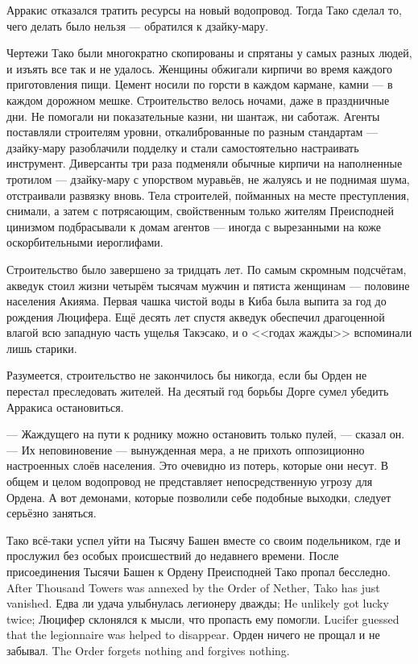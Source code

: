 Арракис отказался тратить ресурсы на новый водопровод.
Тогда Тако сделал то, чего делать было нельзя --- обратился к дзайку-мару.

Чертежи Тако были многократно скопированы и спрятаны у самых разных людей, и изъять все так и не удалось.
Женщины обжигали кирпичи во время каждого приготовления пищи.
Цемент носили по горсти в каждом кармане, камни --- в каждом дорожном мешке.
Строительство велось ночами, даже в праздничные дни.
Не помогали ни показательные казни, ни шантаж, ни саботаж.
Агенты поставляли строителям уровни, откалиброванные по разным стандартам --- дзайку-мару разоблачили подделку и стали самостоятельно настраивать инструмент.
Диверсанты три раза подменяли обычные кирпичи на наполненные тротилом --- дзайку-мару с упорством муравьёв, не жалуясь и не поднимая шума, отстраивали развязку вновь.
Тела строителей, пойманных на месте преступления, снимали, а затем с потрясающим, свойственным только жителям Преисподней цинизмом подбрасывали к домам агентов --- иногда с вырезанными на коже оскорбительными иероглифами.

Строительство было завершено за тридцать лет.
По самым скромным подсчётам, акведук стоил жизни четырём тысячам мужчин и пятиста женщинам --- половине населения Акияма.
Первая чашка чистой воды в Киба была выпита за год до рождения Люцифера.
Ещё десять лет спустя акведук обеспечил драгоценной влагой всю западную часть ущелья Такэсако, и о <<годах жажды>> вспоминали лишь старики.

Разумеется, строительство не закончилось бы никогда, если бы Орден не перестал преследовать жителей.
На десятый год борьбы Дорге сумел убедить Арракиса остановиться.

--- Жаждущего на пути к роднику можно остановить только пулей, --- сказал он.
--- Их неповиновение --- вынужденная мера, а не прихоть оппозиционно настроенных слоёв населения.
Это очевидно из потерь, которые они несут.
В общем и целом водопровод не представляет непосредственную угрозу для Ордена.
А вот демонами, которые позволили себе подобные выходки, следует серьёзно заняться.

Тако всё-таки успел уйти на Тысячу Башен вместе со своим подельником, где и прослужил без особых происшествий до недавнего времени.
{После присоединения Тысячи Башен к Ордену Преисподней Тако пропал бесследно.}
{After Thousand Towers was annexed by the Order of Nether, Tako has just vanished.}
{Едва ли удача улыбнулась легионеру дважды;}
{He unlikely got lucky twice;}
{Люцифер склонялся к мысли, что пропасть ему помогли.}
{Lucifer guessed that the legionnaire was helped to disappear.}
{Орден ничего не прощал и не забывал.}
{The Order forgets nothing and forgives nothing.}

